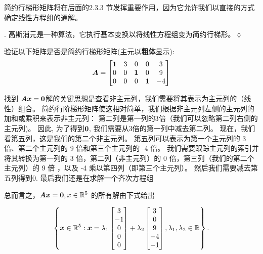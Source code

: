 简约行梯形矩阵将在后面的2.3.3 节发挥重要作用，因为它允许我们以直接的方式确定线性方程组的通解。

\begin{remark}[高斯消元法].
    高斯消元是一种算法，它执行基本变换以将线性方程组变为简约行梯形。\hfill $\lozenge$
\end{remark}

\begin{example}[简约行阶梯形矩阵]
    验证以下矩阵是否是简约行梯形矩阵(主元以\textbf{粗体}显示):
    \begin{equation}
        \boldsymbol{A} =
        \begin{bmatrix}
            \boldsymbol{1} & 3 & 0 & 0 & 3 \\
            0 & 0 & \boldsymbol{1} & 0 & 9 \\
            0 & 0 & 0 & \boldsymbol{1} & -4
        \end{bmatrix}
    \end{equation}
\end{example}

找到 $\boldsymbol{A}\boldsymbol{x} = \boldsymbol{0}$解的关键思想是查看非主元列，我们需要将其表示为主元列的（线性）组合。
简约行阶梯形矩阵使这相对简单，我们根据非主元列左侧的主元列的加和或乘积来表示非主元列：
第二列是第一列的3倍（我们可以忽略第二列右侧的主元列)。
因此, 为了得到$\boldsymbol{0}$, 我们需要从3倍的第一列中减去第二列。
现在，我们看第五列，这是我们的第二个非主元列。
第五列可以表示为第一个主元列的 3 倍、第二个主元列的 9 倍和第三个主元列的 -4 倍。
我们需要跟踪主元列的索引并将其转换为第一列的 3 倍，第二列（非主元列）的 0 倍，第三列（我们的第二个主元列）的 9 倍 ，以及 -4 乘以第四列（即第三个主元列）。
然后我们需要减去第五列得到0.
最后我们还是在求解一个齐次方程组

总而言之，$\boldsymbol{A}\boldsymbol{x} = \boldsymbol{0}, x \in \mathbb{R}^5$ 的所有解由下式给出

\begin{equation}
    \left\{
    \boldsymbol{x} \in \mathbb{R}^5:
    \boldsymbol{x} = \lambda_1
    \begin{bmatrix}
        3 \\ -1 \\ 0 \\ 0 \\ 0
    \end{bmatrix} + \lambda_2
    \begin{bmatrix}
        3 \\ 0 \\ 9 \\ -4 \\ -1
    \end{bmatrix},
    \lambda_1, \lambda_2 \in \mathbb{R}
    \right\}.
\end{equation}

